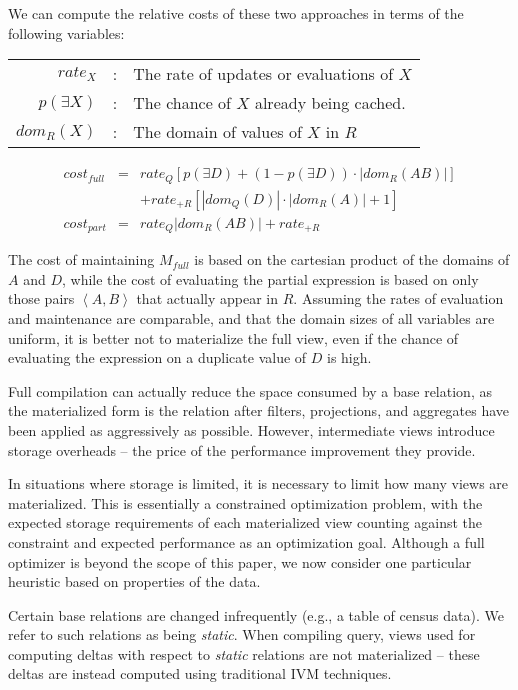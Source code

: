 We can compute the relative costs of these two approaches in terms of the following variables:

\vspace*{0.07in}
{\small
\begin{tabular}{rcl}
$rate_X$ & : & The rate of updates or evaluations of $X$\\
$p(\exists X)$ & : & The chance of $X$ already being cached.\\
$dom_R(X)$ & : & The domain of values of $X$ in $R$\\
\end{tabular}
\vspace*{-0.09in}
\begin{eqnarray*}
cost_{full} & = & rate_{Q} \left[p(\exists D) + (1-p(\exists D))\cdot|dom_R(AB)|\right] \\
 &  & + rate_{+R} \left[|dom_Q(D)|\cdot|dom_R(A)| + 1\right]\\
cost_{part} & = & rate_{Q} |dom_R(AB)| + rate_{+R}
\end{eqnarray*}
}
The cost of maintaining $M_{full}$ is based on the cartesian product of the domains of $A$ and $D$, while the cost of evaluating the partial expression is based on only those pairs $\left<A,B\right>$ that actually appear in $R$.  Assuming the rates of evaluation and maintenance are comparable, and that the domain sizes of all variables are uniform, it is better not to materialize the full view, even if the chance of evaluating the expression on a duplicate value of $D$ is high.

Full compilation can actually reduce the space consumed by a base relation, as the materialized form is the relation after filters, projections, and aggregates have been applied as aggressively as possible.  However, intermediate views introduce storage overheads -- the price of the performance improvement they provide.

In situations where storage is limited, it is necessary to limit how many views are materialized.  This is essentially a constrained optimization problem, with the expected storage requirements of each materialized view counting against the constraint and expected performance as an optimization goal.  Although a full optimizer is beyond the scope of this paper, we now consider one particular heuristic based on properties of the data.

Certain base relations are changed infrequently (e.g., a table of census data).  We refer to such relations as being {\em static}.  When compiling query, views used for computing deltas with respect to {\em static} relations are not materialized -- these deltas are instead computed using traditional IVM techniques.   


